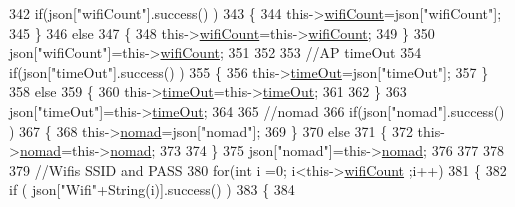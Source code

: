 \begin{DoxyCode}
342             \textcolor{keywordflow}{if}(json[\textcolor{stringliteral}{"wifiCount"}].success() )
343             \{           
344                 this->\hyperlink{class_cool_wifi_ab133bd92fcb895b884deecd6678592e4}{wifiCount}=json[\textcolor{stringliteral}{"wifiCount"}];
345             \}
346             \textcolor{keywordflow}{else}
347             \{
348                 this->\hyperlink{class_cool_wifi_ab133bd92fcb895b884deecd6678592e4}{wifiCount}=this->\hyperlink{class_cool_wifi_ab133bd92fcb895b884deecd6678592e4}{wifiCount};
349             \}
350             json[\textcolor{stringliteral}{"wifiCount"}]=this->\hyperlink{class_cool_wifi_ab133bd92fcb895b884deecd6678592e4}{wifiCount};
351 
352             
353             \textcolor{comment}{//AP timeOut}
354             \textcolor{keywordflow}{if}(json[\textcolor{stringliteral}{"timeOut"}].success() )
355             \{
356                 this->\hyperlink{class_cool_wifi_a952111605f25156588b5632caaba1c6f}{timeOut}=json[\textcolor{stringliteral}{"timeOut"}];
357             \}
358             \textcolor{keywordflow}{else}
359             \{
360                 this->\hyperlink{class_cool_wifi_a952111605f25156588b5632caaba1c6f}{timeOut}=this->\hyperlink{class_cool_wifi_a952111605f25156588b5632caaba1c6f}{timeOut};
361 
362             \}
363             json[\textcolor{stringliteral}{"timeOut"}]=this->\hyperlink{class_cool_wifi_a952111605f25156588b5632caaba1c6f}{timeOut};
364 
365             \textcolor{comment}{//nomad}
366             \textcolor{keywordflow}{if}(json[\textcolor{stringliteral}{"nomad"}].success() )
367             \{
368                 this->\hyperlink{class_cool_wifi_ab7d9643c4af7bac3be331ef008b2ea27}{nomad}=json[\textcolor{stringliteral}{"nomad"}];
369             \}
370             \textcolor{keywordflow}{else}
371             \{
372                 this->\hyperlink{class_cool_wifi_ab7d9643c4af7bac3be331ef008b2ea27}{nomad}=this->\hyperlink{class_cool_wifi_ab7d9643c4af7bac3be331ef008b2ea27}{nomad};
373 
374             \}
375             json[\textcolor{stringliteral}{"nomad"}]=this->\hyperlink{class_cool_wifi_ab7d9643c4af7bac3be331ef008b2ea27}{nomad};
376 
377             
378             
379             \textcolor{comment}{//Wifis SSID and PASS}
380             \textcolor{keywordflow}{for}(\textcolor{keywordtype}{int} i =0; i<this->\hyperlink{class_cool_wifi_ab133bd92fcb895b884deecd6678592e4}{wifiCount} ;i++)
381             \{
382                 \textcolor{keywordflow}{if} ( json[\textcolor{stringliteral}{"Wifi"}+String(i)].success() )
383                 \{
384                     

\end{DoxyCode}
